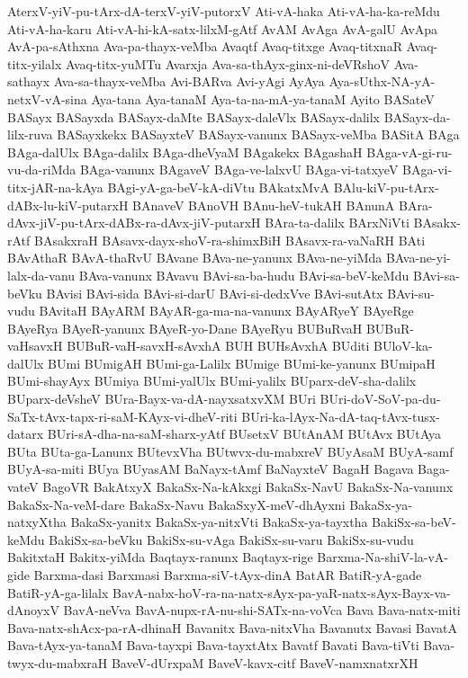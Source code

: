 {AterxV-yiV-pu-tArx-dA-terxV-yiV-putorxV
Ati-vA-haka
Ati-vA-ha-ka-reMdu
Ati-vA-ha-karu
Ati-vA-hi-kA-satx-lilxM-gAtf
AvAM
AvAga
AvA-galU
AvApa
AvA-pa-sAthxna
Ava-pa-thayx-veMba
Avaqtf
Avaq-titxge
Avaq-titxnaR
Avaq-titx-yilalx
Avaq-titx-yuMTu
Avarxja
Ava-sa-thAyx-ginx-ni-deVRshoV
Ava-sathayx
Ava-sa-thayx-veMba
Avi-BARva
Avi-yAgi
AyAya
Aya-sUthx-NA-yA-netxV-vA-sina
Aya-tana
Aya-tanaM
Aya-ta-na-mA-ya-tanaM
Ayito
BASateV
BASayx
BASayxda
BASayx-daMte
BASayx-daleVlx
BASayx-dalilx
BASayx-da-lilx-ruva
BASayxkekx
BASayxteV
BASayx-vanunx
BASayx-veMba
BASitA
BAga
BAga-dalUlx
BAga-dalilx
BAga-dheVyaM
BAgakekx
BAgashaH
BAga-vA-gi-ru-vu-da-riMda
BAga-vanunx
BAgaveV
BAga-ve-lalxvU
BAga-vi-tatxyeV
BAga-vi-titx-jAR-na-kAya
BAgi-yA-ga-beV-kA-diVtu
BAkatxMvA
BAlu-kiV-pu-tArx-dABx-lu-kiV-putarxH
BAnaveV
BAnoVH
BAnu-heV-tukAH
BAnunA
BAra-dAvx-jiV-pu-tArx-dABx-ra-dAvx-jiV-putarxH
BAra-ta-dalilx
BArxNiVti
BAsakx-rAtf
BAsakxraH
BAsavx-dayx-shoV-ra-shimxBiH
BAsavx-ra-vaNaRH
BAti
BAvAthaR
BAvA-thaRvU
BAvane
BAva-ne-yanunx
BAva-ne-yiMda
BAva-ne-yi-lalx-da-vanu
BAva-vanunx
BAvavu
BAvi-sa-ba-hudu
BAvi-sa-beV-keMdu
BAvi-sa-beVku
BAvisi
BAvi-sida
BAvi-si-darU
BAvi-si-dedxVve
BAvi-sutAtx
BAvi-su-vudu
BAvitaH
BAyARM
BAyAR-ga-ma-na-vanunx
BAyARyeY
BAyeRge
BAyeRya
BAyeR-yanunx
BAyeR-yo-Dane
BAyeRyu
BUBuRvaH
BUBuR-vaHsavxH
BUBuR-vaH-savxH-sAvxhA
BUH
BUHsAvxhA
BUditi
BUloV-ka-dalUlx
BUmi
BUmigAH
BUmi-ga-Lalilx
BUmige
BUmi-ke-yanunx
BUmipaH
BUmi-shayAyx
BUmiya
BUmi-yalUlx
BUmi-yalilx
BUparx-deV-sha-dalilx
BUparx-deVsheV
BUra-Bayx-va-dA-nayxsatxvXM
BUri
BUri-doV-SoV-pa-du-SaTx-tAvx-tapx-ri-saM-KAyx-vi-dheV-riti
BUri-ka-lAyx-Na-dA-taq-tAvx-tusx-datarx
BUri-sA-dha-na-saM-sharx-yAtf
BUsetxV
BUtAnAM
BUtAvx
BUtAya
BUta
BUta-ga-Lanunx
BUtevxVha
BUtwvx-du-mabxreV
BUyAsaM
BUyA-samf
BUyA-sa-miti
BUya
BUyasAM
BaNayx-tAmf
BaNayxteV
BagaH
Bagava
Baga-vateV
BagoVR
BakAtxyX
BakaSx-Na-kAkxgi
BakaSx-NavU
BakaSx-Na-vanunx
BakaSx-Na-veM-dare
BakaSx-Navu
BakaSxyX-meV-dhAyxni
BakaSx-ya-natxyXtha
BakaSx-yanitx
BakaSx-ya-nitxVti
BakaSx-ya-tayxtha
BakiSx-sa-beV-keMdu
BakiSx-sa-beVku
BakiSx-su-vAga
BakiSx-su-varu
BakiSx-su-vudu
BakitxtaH
Bakitx-yiMda
Baqtayx-ranunx
Baqtayx-rige
Barxma-Na-shiV-la-vA-gide
Barxma-dasi
Barxmasi
Barxma-siV-tAyx-dinA
BatAR
BatiR-yA-gade
BatiR-yA-ga-lilalx
BavA-nabx-hoV-ra-na-natx-sAyx-pa-yaR-natx-sAyx-Bayx-va-dAnoyxV
BavA-neVva
BavA-nupx-rA-nu-shi-SATx-na-voVca
Bava
Bava-natx-miti
Bava-natx-shAcx-pa-rA-dhinaH
Bavanitx
Bava-nitxVha
Bavanutx
Bavasi
BavatA
Bava-tAyx-ya-tanaM
Bava-tayxpi
Bava-tayxtAtx
Bavatf
Bavati
Bava-tiVti
Bava-twyx-du-mabxraH
BaveV-dUrxpaM
BaveV-kavx-citf
BaveV-namxnatxrXH
}
